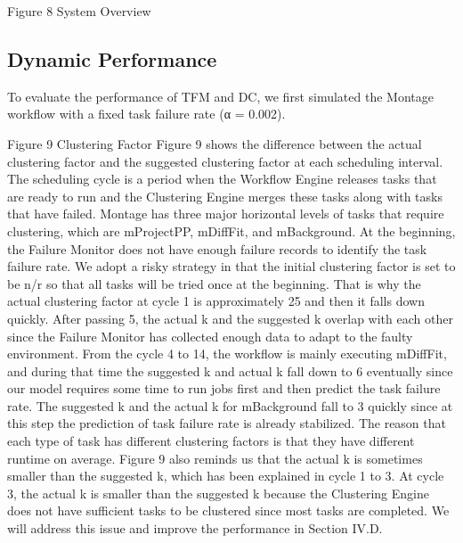 \documentclass{IOS-Book-Article}
\begin{document}
Figure 8	 System Overview
\subsection{Dynamic Performance}
To evaluate the performance of TFM and DC, we first simulated the Montage workflow with a fixed task failure rate (α = 0.002).  
 
Figure 9	Clustering Factor
Figure 9 shows the difference between the actual clustering factor and the suggested clustering factor at each scheduling interval. The scheduling cycle is a period when the Workflow Engine releases tasks that are ready to run and the Clustering Engine merges these tasks along with tasks that have failed. Montage has three major horizontal levels of tasks that require clustering, which are mProjectPP, mDiffFit, and mBackground. At the beginning, the Failure Monitor does not have enough failure records to identify the task failure rate. We adopt a risky strategy in that the initial clustering factor is set to be n/r so that all tasks will be tried once at the beginning. That is why the actual clustering factor at cycle 1 is approximately 25 and then it falls down quickly. After passing 5, the actual k and the suggested k overlap with each other since the Failure Monitor has collected enough data to adapt to the faulty environment. From the cycle 4 to 14, the workflow is mainly executing mDiffFit, and during that time the suggested k and actual k fall down to 6 eventually since our model requires some time to run jobs first and then predict the task failure rate. The suggested k and the actual k for mBackground fall to 3 quickly since at this step the prediction of task failure rate is already stabilized. The reason that each type of task has different clustering factors is that they have different runtime on average. 
  Figure 9 also reminds us that the actual k is sometimes smaller than the suggested k, which has been explained in cycle 1 to 3. At cycle 3, the actual k is smaller than the suggested k because the Clustering Engine does not have sufficient tasks to be clustered since most tasks are completed. We will address this issue and improve the performance in Section IV.D. 
\end{document}
